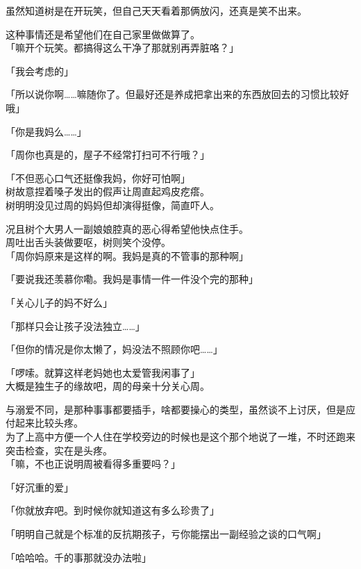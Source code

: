 虽然知道树是在开玩笑，但自己天天看着那俩放闪，还真是笑不出来。

这种事情还是希望他们在自己家里做做算了。\\

「嘛开个玩笑。都搞得这么干净了那就别再弄脏咯？」

「我会考虑的」

「所以说你啊……嘛随你了。但最好还是养成把拿出来的东西放回去的习惯比较好哦」

「你是我妈么……」

「周你也真是的，屋子不经常打扫可不行哦？」

「不但恶心口气还挺像我妈，你好可怕啊」\\

树故意捏着嗓子发出的假声让周直起鸡皮疙瘩。\\

树明明没见过周的妈妈但却演得挺像，简直吓人。

况且树个大男人一副娘娘腔真的恶心得希望他快点住手。\\

周吐出舌头装做要呕，树则笑个没停。\\

「周你妈原来是这样的啊。我妈是真的不管事的那种啊」

「要说我还羡慕你嘞。我妈是事情一件一件没个完的那种」

「关心儿子的妈不好么」

「那样只会让孩子没法独立……」

「但你的情况是你太懒了，妈没法不照顾你吧……」

「啰嗦。就算这样老妈她也太爱管我闲事了」\\

大概是独生子的缘故吧，周的母亲十分关心周。

与溺爱不同，是那种事事都要插手，啥都要操心的类型，虽然谈不上讨厌，但是应付起来比较头疼。\\

为了上高中方便一个人住在学校旁边的时候也是这个那个地说了一堆，不时还跑来突击检查，实在是头疼。\\

「嘛，不也正说明周被看得多重要吗？」

「好沉重的爱」

「你就放弃吧。到时候你就知道这有多么珍贵了」

「明明自己就是个标准的反抗期孩子，亏你能摆出一副经验之谈的口气啊」

「哈哈哈。千的事那就没办法啦」\\

